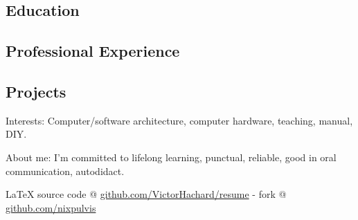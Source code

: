 \documentclass[10pt,a4paper]{article}
\newcommand{\latex}{\LaTeX\xspace}
\newenvironment{indentsection}[1]
{\begin{list}{}
  {\setlength{\leftmargin}{#1}} \item[]
}
{\end{list}}
\begin{document}


\vspace{-0.2em}


\subsection*{Education}


\subsection*{Professional Experience}


\subsection*{Projects}


\begin{indentsection}{\parindent}
\begin{description*}
\item[Interests:]
  Computer/software architecture, computer hardware, teaching,
  manual, DIY.
\item[About me:]
  I’m committed to lifelong learning, punctual, reliable,
  good in oral communication, autodidact.
\end{description*}
\end{indentsection}

\begin{center}
\footnotesize \latex source code @
\href{http://www.github.com/VictorHachard/resume}
{github.com/VictorHachard/resume} - fork @
\href{http://www.github.com/nixpulvis}
{github.com/nixpulvis}
\end{center}
\end{document}
